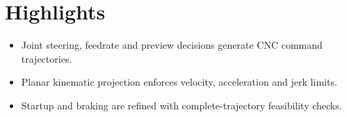 \documentclass[11pt,a4paper]{article}
\begin{document}
\section*{Highlights}
\begin{itemize}
\item Joint steering, feedrate and preview decisions generate CNC command trajectories.
\item Planar kinematic projection enforces velocity, acceleration and jerk limits.
\item Startup and braking are refined with complete-trajectory feasibility checks.
\end{itemize}
\end{document}
